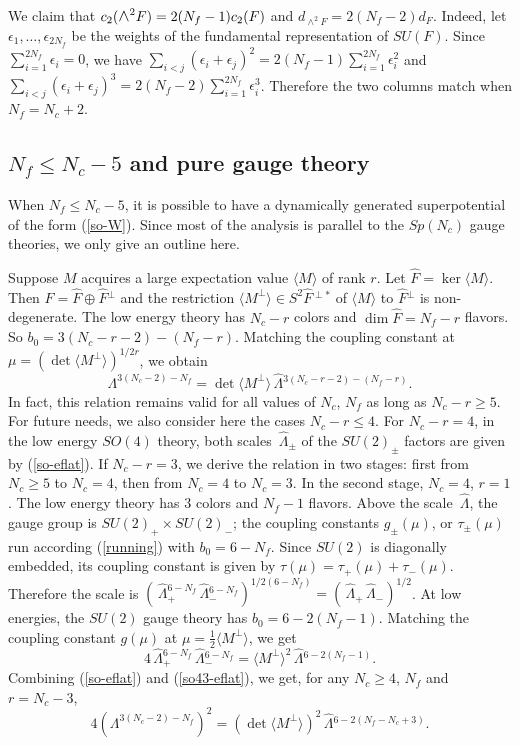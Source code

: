 \documentclass[lecture]{qft-l}
\newcommand{\eps}{\epsilon}
\newcommand{\Lam}{\varLambda}
\newcommand{\medwedge}{\mbox{\fontsize{12pt}{0pt}\selectfont $\wedge$}}
\newcommand{\bra}{\langle}
\newcommand{\ket}{\rangle}
\newcommand{\inv}[1]{\frac{1}{#1}}
\newcommand{\hf}{{\textstyle \inv{2}}}
\newcommand{\hLam}{\,\hat{\!\Lam}{}}
\newcommand{\hF}{\hat{F}{}}
\newcommand{\Mperp}{\bra M^\perp\ket}
\def\Subhead#1{\subsection*{#1}}
\begin{document}
\medskip\noindent
We claim that $c_2(\medwedge^2F)=2(N_f-1)c_2(F)$ and 
$d_{\wedge^2F}=2(N_f-2)d_F$.
Indeed, 
let $\eps_1,\dots,\eps_{2N_f}$ be the weights of the fundamental
representation of $SU(F)$.
Since $\sum_{i=1}^{2N_f}\eps_i=0$, we have
$\sum_{i<j}(\eps_i+\eps_j)^2=2(N_f-1)\sum_{i=1}^{2N_f}\eps_i^2$ and
$\sum_{i<j}(\eps_i+\eps_j)^3=2(N_f-2)\sum_{i=1}^{2N_f}\eps_i^3$.
Therefore the two columns match when $N_f=N_c+2$.



\Subhead{{\boldmath $N_f\le N_c-5$} and pure gauge theory}

When $N_f\le N_c-5$, it is possible to have a dynamically generated
superpotential of the form (\ref{so-W}).
Since most of the analysis is parallel to the $Sp(N_c)$ gauge theories,
we only give an outline here.


Suppose $M$ acquires a large expectation value $\bra M\ket$ of rank $r$.
Let $\hF=\ker\bra M\ket$.
Then $F=\hF\oplus\hF^\perp$ and the restriction $\Mperp\in S^2\hF^{\perp *}$
of $\bra M\ket$ to $\hF^\perp$ is non-degenerate.
The low energy theory has $N_c-r$ colors and $\dim\hF=N_f-r$ flavors.
So $b_0=3(N_c-r-2)-(N_f-r)$.
Matching the coupling constant at $\mu=(\det\Mperp)^{1/2r}$, we obtain
        \begin{equation}\label{so-eflat}
\Lam^{3(N_c-2)-N_f}=\det\Mperp\hLam^{3(N_c-r-2)-(N_f-r)}.
        \end{equation}
In fact, this relation remains valid for all values of $N_c$, $N_f$ as long as
$N_c-r\ge5$.
For future needs, we also consider here the cases $N_c-r\le4$.
For $N_c-r=4$, in the low energy $SO(4)$ theory, both scales $\hLam_\pm$ of
the $SU(2)_\pm$ factors are given by (\ref{so-eflat}).
If $N_c-r=3$, we derive the relation in two stages:
first from $N_c\ge5$ to $N_c=4$, then from $N_c=4$ to $N_c=3$. 
In the second stage, $N_c=4$, $r=1$.
The low energy theory has $3$ colors and $N_f-1$ flavors.
Above the scale $\hLam$, the gauge group is $SU(2)_+\times SU(2)_-$;
the coupling constants $g_\pm(\mu)$, or $\tau_\pm(\mu)$ run according
(\ref{running}) with $b_0=6-N_f$.
Since $SU(2)$ is diagonally embedded, its coupling constant is given by
$\tau(\mu)=\tau_+(\mu)+\tau_-(\mu)$.
Therefore the scale is
$(\hLam_+^{6-N_f}\hLam_-^{6-N_f})^{1/2(6-N_f)}=(\hLam_+\hLam_-)^{1/2}$.
At low energies, the $SU(2)$ gauge theory has $b_0=6-2(N_f-1)$.
Matching the coupling constant $g(\mu)$ at $\mu=\hf\Mperp$, we get
	\begin{equation}\label{so43-eflat}
4\hLam_+^{6-N_f}\hLam_-^{6-N_f}=\Mperp^2\hLam^{6-2(N_f-1)}.
	\end{equation}
Combining (\ref{so-eflat}) and (\ref{so43-eflat}), we get,
for any $N_c\ge4$, $N_f$ and $r=N_c-3$,
	\begin{equation}\label{so3-eflat}
4(\Lam^{3(N_c-2)-N_f})^2=(\det\Mperp)^2\hLam^{6-2(N_f-N_c+3)}.
	\end{equation}
\end{document}
